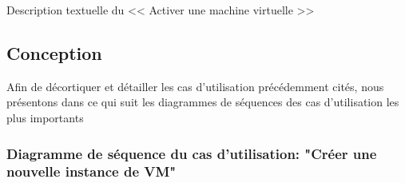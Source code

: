 \begin{table}[H]
\caption{Description textuelle du << Activer une machine virtuelle >> }
\label{Description textuelle du << Activer une machine virtuelle >>}
\end{table}

\subsection{Conception}
Afin de décortiquer et détailler les cas d'utilisation précédemment cités, nous présentons dans ce qui suit les diagrammes de séquences des cas d'utilisation les plus importants
\subsubsection{Diagramme de séquence du cas d'utilisation: "Créer une nouvelle instance de VM"}

